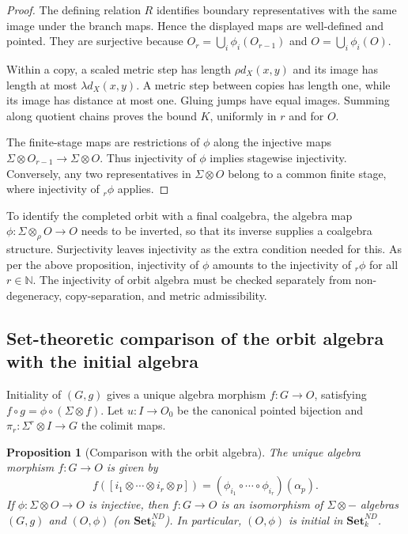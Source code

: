\documentclass{sn-jnl}%
\theoremstyle{thmstyleone}%
\newtheorem{proposition}[theorem]{Proposition}%
\theoremstyle{thmstyletwo}%
\theoremstyle{thmstylethree}%
\newcommand{\setnd}{\mathbf{Set}_{k}^{ND}}
\newcommand{\M}{\Sigma}
\newcommand{\F}{\M\otimes}
\newcommand{\Fw}{\M\otimes_{\w}}
\newcommand{\Fi}[1]{\M^{#1}\otimes }
\newcommand{\f}{\phi}
\newcommand{\w}{\rho}
\begin{document}
\begin{proof}
The defining relation $R$ identifies boundary representatives with the same image under the branch maps. Hence the displayed maps are well-defined and pointed. They are surjective because $O_r=\bigcup_i\f_i(O_{r-1})$ and $O=\bigcup_i\f_i(O)$.

Within a copy, a scaled metric step has length $\rho d_X(x,y)$ and its image has length at most $\lambda d_X(x,y)$. A metric step between copies has length one, while its image has distance at most one. Gluing jumps have equal images. Summing along quotient chains proves the bound $K$, uniformly in $r$ and for $O$.

The finite-stage maps are restrictions of $\f$ along the injective maps $\F O_{r-1}\to\F O$. Thus injectivity of $\f$ implies stagewise injectivity. Conversely, any two representatives in $\F O$ belong to a common finite stage, where injectivity of $ {}_r\f$ applies.
\end{proof}

To identify the completed orbit with a final coalgebra, the algebra map $\f:\Fw O\rightarrow O$ needs to be inverted, so that its inverse supplies a coalgebra structure. Surjectivity leaves injectivity as the extra condition needed for this. As per the above proposition, injectivity of $\f$ amounts to the injectivity of $ {}_r\f $ for all $r\in \mathbb N$. The injectivity of orbit algebra must be checked separately from non-degeneracy, copy-separation, and metric admissibility.

\subsection{Set-theoretic comparison of the orbit algebra with the initial algebra}

Initiality of $(G, g)$ gives a unique algebra morphism $f:G\to O$, satisfying $f\circ g=\f\circ(\F f)$. Let $u:I\to O_0$ be the canonical pointed bijection and $\pi_r:\Fi{r}I\to G$ the colimit maps.

\begin{proposition}[Comparison with the orbit algebra]
\label{pro_IsoO_o_and_G_inSet}
    The unique algebra morphism $f:G\to O$ is given by 
    \begin{equation} 
    \nonumber
        f([i_1\otimes\cdots\otimes i_r\otimes p]) = (\f_{i_1} \circ \cdots \circ \f_{i_r})(\alpha_p).
    \end{equation}
    If $\f:\F O\to O$ is injective, then $f:G\rightarrow O$     is an isomorphism of $\F-$ algebras $(G,g)$ and $(O,\f)$ (on $\setnd$). In particular, $(O,\f)$ is initial in $\setnd$.
\end{proposition}
\end{document}
